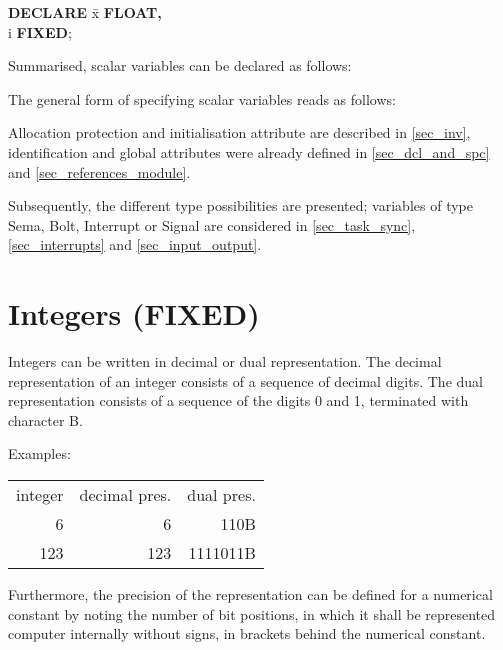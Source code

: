\begin{tabbing}
{\bf DECLARE} \= x {\bf FLOAT,}\\
              \> i {\bf FIXED};
\end{tabbing}

Summarised, scalar variables can be declared as follows:










The general form of specifying scalar variables reads as follows:





Allocation protection and initialisation attribute are described in 
\ref{sec_inv},
identification and global attributes were already defined
in \ref{sec_dcl_and_spc} and \ref{sec_references_module}.

Subsequently, the different type possibilities are presented; variables
of type Sema, Bolt, Interrupt or Signal are considered in 
\ref{sec_task_sync}, \ref{sec_interrupts} and
\ref{sec_input_output}.

\section{Integers (FIXED)}   %

Integers can be written in decimal or dual representation. The decimal
representation of an integer consists of a sequence of decimal digits. The dual
representation consists of a sequence of the digits 0 and 1, terminated
with character B.

Examples:

\begin{tabular}{rrr}
integer & decimal pres. & dual pres. \\
      6 &             6 &     110B \\
    123 &           123 & 1111011B
\end{tabular}

Furthermore, the precision of the representation can be defined for a
numerical constant by noting the number of bit positions, in which it
shall be represented computer internally without signs, in brackets behind
the numerical constant.

